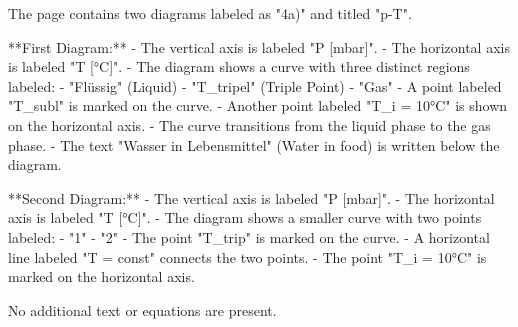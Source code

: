 The page contains two diagrams labeled as "4a)" and titled "p-T".  

**First Diagram:**  
- The vertical axis is labeled "P [mbar]".  
- The horizontal axis is labeled "T [°C]".  
- The diagram shows a curve with three distinct regions labeled:  
  - "Flüssig" (Liquid)  
  - "T_tripel" (Triple Point)  
  - "Gas"  
- A point labeled "T_subl" is marked on the curve.  
- Another point labeled "T_i = 10°C" is shown on the horizontal axis.  
- The curve transitions from the liquid phase to the gas phase.  
- The text "Wasser in Lebensmittel" (Water in food) is written below the diagram.  

**Second Diagram:**  
- The vertical axis is labeled "P [mbar]".  
- The horizontal axis is labeled "T [°C]".  
- The diagram shows a smaller curve with two points labeled:  
  - "1"  
  - "2"  
- The point "T_trip" is marked on the curve.  
- A horizontal line labeled "T = const" connects the two points.  
- The point "T_i = 10°C" is marked on the horizontal axis.  

No additional text or equations are present.